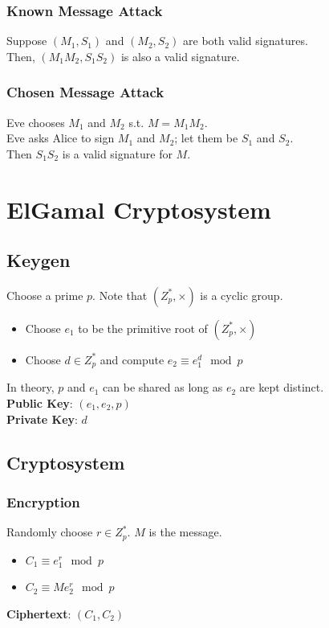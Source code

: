 \documentclass{report}
\begin{document}
			\subsubsection{Known Message Attack}
			Suppose $(M_1,S_1)$ and $(M_2,S_2)$ are both valid signatures.\\
			Then, $(M_1M_2,S_1S_2)$ is also a valid signature.
			
			\subsubsection{Chosen Message Attack}
			Eve chooses $M_1$ and $M_2$ s.t. $M=M_1M_2$.\\
			Eve asks Alice to sign $M_1$ and $M_2$; let them be $S_1$ and $S_2$.\\
			Then $S_1S_2$ is a valid signature for $M$.
		
	\section{ElGamal Cryptosystem}
		\subsection{Keygen}
			Choose a prime $p$. Note that $(Z_p^*,\times)$ is a cyclic group.
			\begin{itemize}
				\item Choose $e_1$ to be the primitive root of $(Z_p^*,\times)$
				\item Choose $d \in Z_p^*$ and compute $e_2 \equiv e_1^d \mod p$
			\end{itemize}
			In theory, $p$ and $e_1$ can be shared as long as $e_2$ are kept distinct.\\
			\textbf{Public Key}: $(e_1,e_2,p)$\\
			\textbf{Private Key}: $d$
		
		\subsection{Cryptosystem}
			\subsubsection{Encryption}
				Randomly choose $r \in Z_p^*$. $M$ is the message.
				\begin{itemize}
					\item $C_1 \equiv e_1^r \mod p$
					\item $C_2 \equiv Me_2^r \mod p$
				\end{itemize}
				\textbf{Ciphertext}: $(C_1,C_2)$
			
\end{document}
